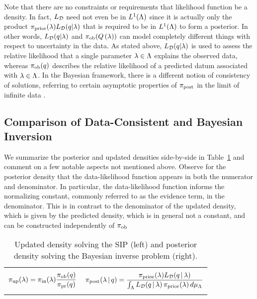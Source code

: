 Note that there are no constraints or requirements that likelihood function be a density.
In fact, $L_{\mathcal{D}}$ need not even be in $L^1({\Lambda})$ since it is actually only the product $\operatorname*{\pi_{prior}}(\lambda) L_{\mathcal{D}} (q | \lambda)$ that is required to be in $L^1({\Lambda})$ to form a posterior.
In other words, $L_{\mathcal{D}} (q | \lambda)$ and $\operatorname*{\pi_{ob}}(Q\left ( \lambda \right ))$ can model completely different things with respect to uncertainty in the data.
As stated above, $L_{\mathcal{D}} (q | \lambda)$ is used to assess the relative likelihood that a single parameter $\lambda\in{\Lambda}$ explains the observed data, whereas $\operatorname*{\pi_{ob}}(q)$ describes the relative likelihood of a predicted datum associated with $\lambda\in{\Lambda}$.
In the Bayesian framework, there is a different notion of consistency of solutions, referring to certain asymptotic properties of $\operatorname*{\pi_{post}}$ in the limit of infinite data \cite{Barron, Silverman}.




\subsection{Comparison of Data-Consistent and Bayesian Inversion}\label{sec:bayesian}

We summarize the posterior and updated densities side-by-side in Table~\ref{tab:dens_comparisons} and comment on a few notable aspects not mentioned above.
Observe for the posterior density that the data-likelihood function appears in both the numerator and denominator.
In particular, the data-likelihood function informs the {normalizing constant}, commonly referred to as the evidence term, in the denominator.
This is in contrast to the denominator of the updated density, which is given by the predicted density, which is in general not a constant, and can be constructed independently of $\operatorname*{\pi_{ob}}$

\begin{table}[htbp]
\centering
\begin{tabular}{|c|c|}
\hline
 & \\
$\displaystyle \operatorname*{\pi_{up}}(\lambda) = \operatorname*{\pi_{in}}(\lambda) \frac{\operatorname*{\pi_{ob}}(q)}{\operatorname*{\pi_{pr}}(q)}
$
&
$
	\displaystyle \pi_{\text{post}}(\lambda\,|\,q) = \frac{\operatorname*{\pi_{prior}}(\lambda)L_{\mathcal{D}}(q \,|\,\lambda)}{\int_{\Lambda} L_{\mathcal{D}}(q \, |\, \lambda)  \operatorname*{\pi_{prior}}(\lambda) \, d\mu_{{\Lambda}}}
$
 \\ & \\ \hline
\end{tabular}
\caption{Updated density solving the SIP (left) and posterior density solving the Bayesian inverse problem (right).}
		\label{tab:dens_comparisons}
\end{table}

